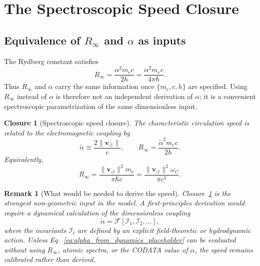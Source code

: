 \documentclass[aps,pra,preprint,longbibliography,nofootinbib]{revtex4-2}
\newtheorem{remark}{Remark}
\newtheorem{closure}{Closure}
\newcommand{\vnorm}{\lVert\mathbf{v}_{\!\boldsymbol{\circlearrowleft}}\rVert} %
\begin{document}
\section{The Spectroscopic Speed Closure}
\label{sec:rydberg}

\subsection{Equivalence of $R_\infty$ and $\alpha$ as inputs}

The Rydberg constant satisfies
\begin{equation}
  R_\infty = \frac{\alpha^2 m_e c}{2h}
           = \frac{\alpha^2 m_e c}{4\pi\hbar}.
  \label{eq:Rydberg_standard}
\end{equation}
Thus $R_\infty$ and $\alpha$ carry the same information once
$\{m_e,c,h\}$ are specified.  Using $R_\infty$ instead of $\alpha$ is
therefore not an independent derivation of $\alpha$; it is a convenient
spectroscopic parametrization of the same dimensionless input.

\begin{closure}[Spectroscopic speed closure]
\label{cl:speed}
The characteristic circulation speed is related to the electromagnetic
coupling by
\begin{equation}
  \tilde\alpha \equiv \frac{2\vnorm}{c},
  \qquad
  R_\infty = \frac{\tilde\alpha^2 m_e c}{2h}.
  \label{eq:speed_closure}
\end{equation}
Equivalently,
\begin{equation}
  R_\infty = \frac{\vnorm^2 m_e}{\pi\hbar c}
           = \frac{\vnorm^2\omega_C}{\pi c^3}.
  \label{eq:rydberg_core}
\end{equation}
\end{closure}

\begin{remark}[What would be needed to derive the speed]
\label{rem:derive_speed}
Closure~\ref{cl:speed} is the strongest non-geometric input in the
model.  A first-principles derivation would require a dynamical
calculation of the dimensionless coupling
\begin{equation}
  \tilde\alpha = \mathcal{F}[\mathcal{I}_1,\mathcal{I}_2,\ldots],
  \label{eq:alpha_from_dynamics_placeholder}
\end{equation}
where the invariants $\mathcal{I}_i$ are defined by an explicit
field-theoretic or hydrodynamic action.  Unless Eq.~\eqref{eq:alpha_from_dynamics_placeholder}
can be evaluated without using $R_\infty$, atomic spectra, or the
CODATA value of $\alpha$, the speed remains calibrated rather than
derived.
\end{remark}
\end{document}
